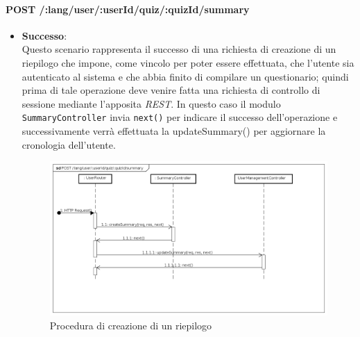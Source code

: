 \paragraph{POST /:lang/user/:userId/quiz/:quizId/summary} %
\begin{itemize}
\item \textbf{Successo}:\\
Questo scenario rappresenta il successo di una richiesta di creazione di un riepilogo che impone, come vincolo per poter essere effettuata, che l'utente sia autenticato al sistema e che abbia finito di compilare un questionario; quindi prima di tale operazione deve venire fatta una richiesta di controllo di sessione mediante l'apposita \textit{REST}. In questo caso il modulo \texttt{SummaryController} invia \texttt{next()} per indicare il successo dell'operazione e successivamente verrà effettuata la updateSummary() per aggiornare la cronologia dell'utente.
\label{Procedura di creazione di un riepilogo}
\begin{figure}[ht]
	\centering
	\includegraphics[scale=0.40]{UML/DiagrammiDiSequenza/Back-end/POST__lang_user_userId_quiz_quizId_summary_success.png}
	\caption{Procedura di creazione di un riepilogo}
\end{figure}
\FloatBarrier


\end{itemize}
